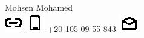 {
  \noindent
  \fontsize{27pt}{27pt}\blackColor\optifont
  Mohsen Mohamed
} \\
%
\href{https://\domain}{
  \includegraphics[align=c]{assets/icons/url.eps}
  \quad\domain
}
%
\quad\quad
\href{tel:+201050955843}{
  \includegraphics[align=c]{assets/icons/phone.eps}
  \enspace +20 105 09 55 843
}
%
\quad\quad
\href{mailto:\email}{
  \includegraphics[align=c]{assets/icons/email.eps}
  \enspace\email
}